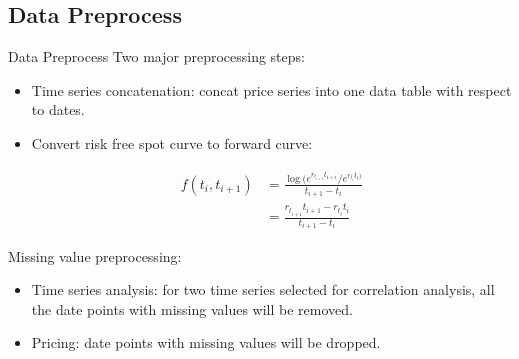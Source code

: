 \documentclass[8pt]{beamer}
\numberwithin{equation}{section}
\begin{document}
\subsection{Data Preprocess}
\begin{frame}{Data Preprocess}
Two major preprocessing steps:

\begin{itemize}
	\item Time series concatenation: concat price series into one data table with respect to dates.
	\item Convert risk free spot curve to forward curve:
	
	\begin{equation} \label{eq:4}
	\begin{aligned}
	f(t_i, t_{i+1}) &= \frac {\log (e^{r_{t_{i+1}}t_{i+1}} / e^ {r_{t_i}t_i)}} {t_{i+1} - t_i}
	\\
	&= \frac {r_{t_{i+1}}t_{i+1} - r_{t_i}t_i}{t_{i+1} - t_i}
	\end{aligned}
	\end{equation}
\end{itemize}

Missing value preprocessing:

\begin{itemize}
	\item Time series analysis: for two time series selected for correlation analysis, all the date points with missing values will be removed.
	\item Pricing: date points with missing values will be dropped.
\end{itemize}
\end{frame}
\end{document}
